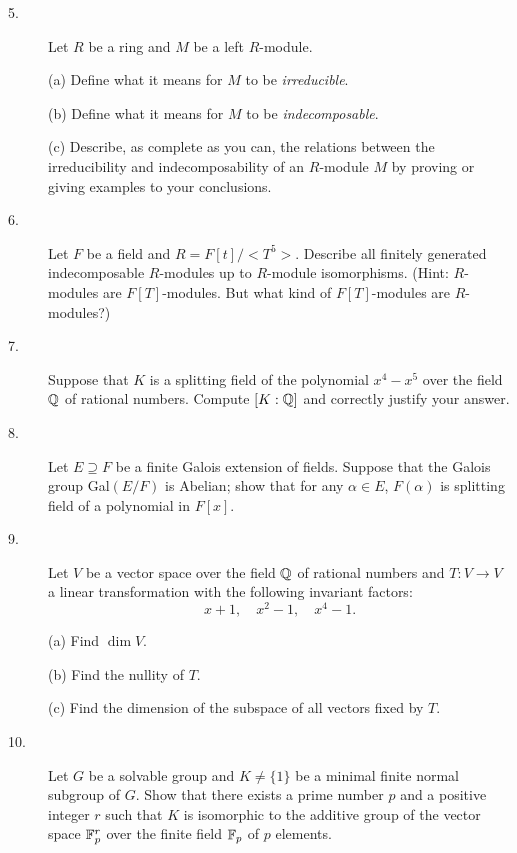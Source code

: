 \documentclass{article}
\begin{document}
\begin{description}
\item[5.]
Let $R$ be a ring and $M$ be a left $R$-module.

\item[\quad] (a)
Define what it means for $M$ to be {\it irreducible}.

\item[\quad] (b)
Define what it means for $M$ to be {\it indecomposable}.

\item[\quad] (c)
Describe, as complete as you can, the relations between the irreducibility
and indecomposability of an $R$-module $M$ by proving or giving
examples to your conclusions.

\item[6.]
Let $F$ be a field and $R=F[t] / <T^5>$. Describe all finitely generated
indecomposable $R$-modules up to $R$-module isomorphisms. (Hint:
$R$-modules are $F[T]$-modules. But what kind of $F[T]$-modules
are $R$-modules?)

\item[7.]
Suppose that $K$ is a splitting field of the polynomial $x^4-x^5$ over the
field $\Bbb Q$ of rational numbers. Compute $[K:\Bbb Q]$ and correctly
justify your answer.

\item[8.]
Let $E \supseteq F$ be a finite Galois extension of fields. Suppose that the
Galois group Gal$(E/F)$ is Abelian; show that for any $\alpha \in E$,
$F(\alpha)$ is splitting field of a polynomial in $F[x]$.

\item[9.]
Let $V$ be a vector space over the field $\Bbb Q$ of rational numbers and
$T:V \to V$ a linear transformation with the following invariant factors:
$$x +1, \quad x^2-1, \quad x^4 -1.$$

\item[\quad] (a)
Find $\dim V$.

\item[\quad] (b)
Find the nullity of $T$.

\item[\quad] (c)
Find the dimension of the subspace of all vectors fixed by $T$.

\item[10.]
Let $G$ be a solvable group and $K \neq \{1\}$ be a minimal finite normal
subgroup of $G$. Show that there exists a prime number $p$ and a positive
integer $r$ such that $K$ is isomorphic to the additive group of the vector
space $\Bbb F^r_p$ over the finite field $\Bbb F_p$ of $p$ elements.




\end{description}    
\end{document}
